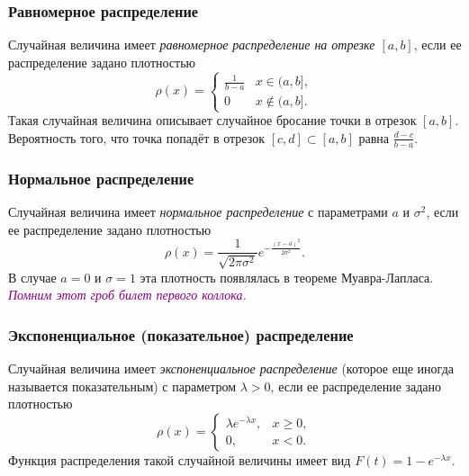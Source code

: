 \subsubsection{Равномерное распределение}

Случайная величина имеет {\it равномерное распределение на отрезке $[a, b]$}, если
ее распределение задано плотностью
\[
    \rho(x) = \begin{cases}
        \frac{1}{b - a} & x \in (a, b], \\
        0 & x \notin (a, b].
    \end{cases}
\]
Такая случайная величина описывает случайное бросание точки в отрезок $[a, b]$.
Вероятность того, что точка попадёт в отрезок $[c, d] \subset [a, b]$ равна $\frac{d - c}{b - a}$.

\subsubsection{Нормальное распределение}

Случайная величина имеет {\it нормальное распределение} с параметрами $a$ и $\sigma^2$, если ее распределение задано плотностью
\[
    \rho(x) = \frac{1}{\sqrt{2 \pi \sigma^2}} e^{-\frac{(x - a)^2}{2 \sigma^2}}.
\]
В случае $a = 0$ и $\sigma = 1$ эта плотность появлялась в теореме Муавра-Лапласа.
\textcolor{purple}{\it Помним этот гроб билет первого коллока.}

\subsubsection{Экспоненциальное (показательное) распределение}

Случайная величина имеет {\it экспоненциальное распределение} (которое еще иногда называется показательным) с параметром $\lambda > 0$, если ее распределение задано плотностью
\[
    \rho(x) = \begin{cases}
        \lambda e^{-\lambda x}, & x \geqslant 0, \\
        0, & x < 0.
    \end{cases}
\]
Функция распределения такой случайной величины имеет вид $F(t) = 1 - e^{-\lambda x}$.
